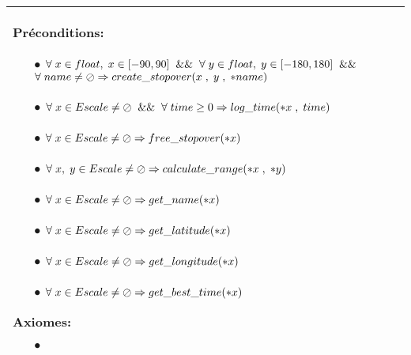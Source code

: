 \documentclass[a4paper, 11pt, oneside]{article}
\begin{document}
\begin{tabular}{|p{17cm}|c}
			\textbf{Préconditions:}
				\begin{itemize}
					\item[$\bullet$] $\forall \hspace{1mm} x \in float, \hspace{1mm} x \in [-90,90] \hspace{2mm} \&\& \hspace{2mm} \forall \hspace{1mm} y \in float, \hspace{1mm} y \in [-180,180]  \hspace{2mm} \&\&$ \newline $\forall \hspace{1mm} name \neq \oslash \Rightarrow create\_stopover(x \hspace{1mm} , \hspace{1mm} y \hspace{1mm} , \hspace{1mm} *name)$
					\item[$\bullet$] $\forall \hspace{1mm} x \in Escale \neq \oslash \hspace{2mm} \&\& \hspace{2mm} \forall \hspace{1mm} time \geq 0 \Rightarrow log\_time(*x \hspace{1mm} , \hspace{1mm} time) $
					\item[$\bullet$] $\forall \hspace{1mm} x \in Escale \neq \oslash \Rightarrow free\_stopover(*x)$ 
					\item[$\bullet$] $\forall \hspace{1mm} x, \hspace{1mm} y \in Escale \neq \oslash \Rightarrow calculate\_range(*x \hspace{1mm} , \hspace{1mm} *y)$
					\item[$\bullet$] $\forall \hspace{1mm} x \in Escale \neq \oslash \Rightarrow get\_name(*x)$ 
					\item[$\bullet$] $\forall \hspace{1mm} x \in Escale \neq \oslash \Rightarrow get\_latitude(*x)$ 
					\item[$\bullet$] $\forall \hspace{1mm} x \in Escale \neq \oslash \Rightarrow get\_longitude(*x)$ 
					\item[$\bullet$] $\forall \hspace{1mm} x \in Escale \neq \oslash \Rightarrow get\_best\_time(*x)$ 
				\end{itemize}
				
			\textbf{Axiomes:}
				\begin{itemize}
					\item[$\bullet$] 
				\end{itemize}
				
			\\	
			\hline
		\end{tabular}
		 
\end{document}

